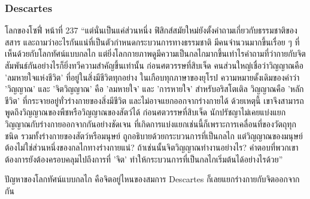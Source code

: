 \subsubsection{Descartes}

\begin{bookquote}{โลกของโซฟี่ หน้าที่ 237}
“แต่นั่นเป็นแค่ส่วนหนึ่ง ฟิสิกส์สมัยใหม่ยังตั้งคำถามเกี่ยวกับธรรมชาติของสสาร และถามว่าอะไรกันแน่ที่เป็นตัวกำหนดกระบวนการทางธรรมชาติ มีคนจำนวนมากขึ้นเรื่อย ๆ ที่เห็นด้วยกับโลกทัศน์แบบกลไก แต่ยิ่งโลกกายภาพดูมีความเป็นกลไกมากขึ้นเท่าไรคำถามที่ว่ากายกับจิตสัมพันธ์กันอย่างไรก็ยิ่งทวีความสำคัญขึ้นเท่านั้น ก่อนศตวรรษที่สิบเจ็ด คนส่วนใหญ่เชื่อว่าวิญญาณคือ 'ลมหายใจแห่งชีวิต' ที่อยู่ในสิ่งมีชีวิตทุกอย่าง ในเกือบทุกภาษาของยุโรป ความหมายดั้งเดิมของคำว่า 'วิญญาณ' และ 'จิตวิญญาณ' คือ 'ลมหายใจ' และ 'การหายใจ' สำหรับอริสโตเติล วิญญาณคือ 'หลักชีวิต' ที่กระจายอยู่ทั่วร่างกายของสิ่งมีชีวิต และไม่อาจแยกออกจากร่างกายได้ ด้วยเหตุนี้ เขาจึงสามารถพูดถึงวิญญาณของพืชหรือวิญญาณของสัตว์ได้ ก่อนศตวรรษที่สิบเจ็ด นักปรัชญาไม่เคยแบ่งแยกวิญญาณกับร่างกายออกจากกันอย่างชัดเจน ที่เกิดการแบ่งแยกเช่นนี้ก็เพราะการเคลื่อนที่ของวัตถุทุกชนิด รวมทั้งร่างกายของสัตว์หรือมนุษย์ ถูกอธิบายด้วยกระบวนการที่เป็นกลไก แต่วิญญาณของมนุษย์ต้องไม่ใช่ส่วนหนึ่งของกลไกทางร่างกายแน่? ถ้าเช่นนั้นจิตวิญญาณทำงานอย่างไร? คำตอบที่พวกเขาต้องการยังต้องครอบคลุมไปถึงการที่ 'จิต' ทำให้กระบวนการที่เป็นกลไกเริ่มต้นได้อย่างไรด้วย”
\end{bookquote}

ปัญหาของโลกทัศน์แบบกลไก คือจิตอยู่ไหนของสมการ Descartes ก็เลยแยกร่างกายกับจิตออกจากกัน

